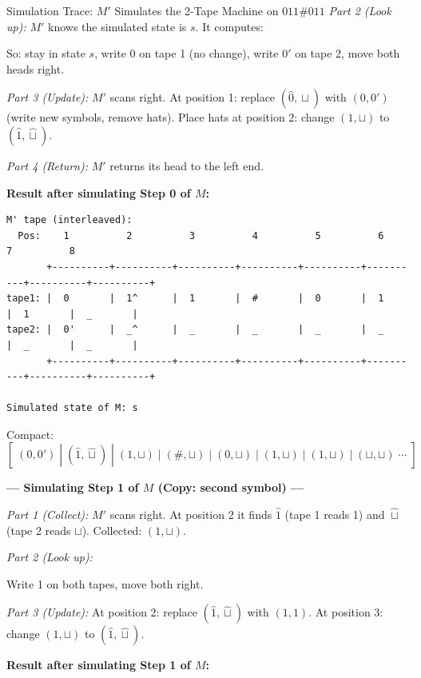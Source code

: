 \begin{examplebox}{{Simulation Trace: $M'$ Simulates the 2-Tape Machine on $011\#011$}}
\textit{Part 2 (Look up):} $M'$ knows the simulated state is $s$. It computes:


So: stay in state $s$, write 0 on tape 1 (no change), write $0'$ on tape 2, move both heads right.

\textit{Part 3 (Update):} $M'$ scans right. At position 1: replace $(\hat{0}, \hat{\sqcup})$ with $(0, 0')$ (write new symbols, remove hats). Place hats at position 2: change $(1, \sqcup)$ to $(\hat{1}, \hat{\sqcup})$.

\textit{Part 4 (Return):} $M'$ returns its head to the left end.

\textbf{Result after simulating Step 0 of $M$:}

\begin{lstlisting}
M' tape (interleaved):
  Pos:    1          2          3          4          5          6          7          8
       +----------+----------+----------+----------+----------+----------+----------+----------+
tape1: |  0       |  1^      |  1       |  #       |  0       |  1       |  1       |  _       |
tape2: |  0'      |  _^      |  _       |  _       |  _       |  _       |  _       |  _       |
       +----------+----------+----------+----------+----------+----------+----------+----------+

Simulated state of M: s
\end{lstlisting}

Compact: $[\;(0, 0')\;|\;(\hat{1}, \hat{\sqcup})\;|\;(1, \sqcup)\;|\;(\#, \sqcup)\;|\;(0, \sqcup)\;|\;(1, \sqcup)\;|\;(1, \sqcup)\;|\;(\sqcup, \sqcup)\;\cdots\;]$

\bigskip
\textbf{--- Simulating Step 1 of $M$ (Copy: second symbol) ---}

\textit{Part 1 (Collect):} $M'$ scans right. At position 2 it finds $\hat{1}$ (tape 1 reads 1) and $\hat{\sqcup}$ (tape 2 reads $\sqcup$). Collected: $(1, \sqcup)$.

\textit{Part 2 (Look up):}


Write 1 on both tapes, move both right.

\textit{Part 3 (Update):} At position 2: replace $(\hat{1}, \hat{\sqcup})$ with $(1, 1)$. At position 3: change $(1, \sqcup)$ to $(\hat{1}, \hat{\sqcup})$.

\textbf{Result after simulating Step 1 of $M$:}


\end{examplebox}
